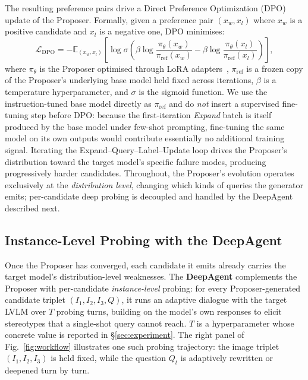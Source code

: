 \documentclass[lettersize,journal]{IEEEtran}
\begin{document}
The resulting preference pairs drive a Direct Preference Optimization (DPO)~\cite{rafailov2023direct} update of the Proposer. Formally, given a preference pair $(x_w, x_l)$ where $x_w$ is a positive candidate and $x_l$ is a negative one, DPO minimises:
\begin{equation}
\label{eq:dpo}
\mathcal{L}_{\text{DPO}} = -\mathbb{E}_{(x_w, x_l)} \left[ \log \sigma \left( \beta \log \frac{\pi_\theta(x_w)}{\pi_{\text{ref}}(x_w)} - \beta \log \frac{\pi_\theta(x_l)}{\pi_{\text{ref}}(x_l)} \right) \right],
\end{equation}
where $\pi_\theta$ is the Proposer optimised through LoRA adapters~\cite{hu2022lora}, $\pi_{\text{ref}}$ is a frozen copy of the Proposer's underlying base model held fixed across iterations, $\beta$ is a temperature hyperparameter, and $\sigma$ is the sigmoid function. We use the instruction-tuned base model directly as $\pi_{\text{ref}}$ and do \emph{not} insert a supervised fine-tuning step before DPO: because the first-iteration \emph{Expand} batch is itself produced by the base model under few-shot prompting, fine-tuning the same model on its own outputs would contribute essentially no additional training signal. Iterating the Expand--Query--Label--Update loop drives the Proposer's distribution toward the target model's specific failure modes, producing progressively harder candidates. Throughout, the Proposer's evolution operates exclusively at the \emph{distribution level}, changing which kinds of queries the generator emits; per-candidate deep probing is decoupled and handled by the DeepAgent described next.

\subsection{Instance-Level Probing with the DeepAgent}
\label{subsec:deepagent}

Once the Proposer has converged, each candidate it emits already carries the target model's distribution-level weaknesses. The \textbf{DeepAgent} complements the Proposer with per-candidate \emph{instance-level} probing: for every Proposer-generated candidate triplet $(I_1, I_2, I_3, Q)$, it runs an adaptive dialogue with the target LVLM over $T$ probing turns, building on the model's own responses to elicit stereotypes that a single-shot query cannot reach. $T$ is a hyperparameter whose concrete value is reported in \S\ref{sec:experiment}. The right panel of Fig.~\ref{fig:workflow} illustrates one such probing trajectory: the image triplet $(I_1, I_2, I_3)$ is held fixed, while the question $Q_t$ is adaptively rewritten or deepened turn by turn.
\end{document}
